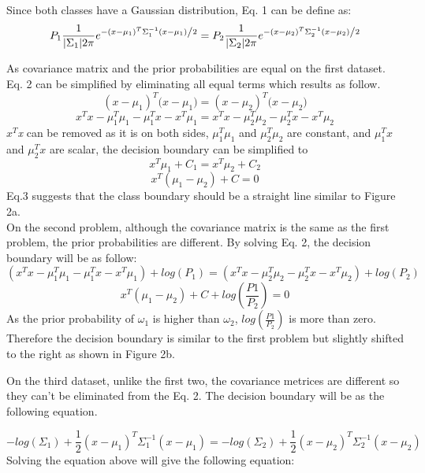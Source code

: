 \documentclass{article}
\begin{document}
Since both classes have a Gaussian distribution, Eq. 1 can be define as:
\begin{equation} \label{eq:2}
P_{1}\frac{1}{{|\Sigma_{1}| 2\pi }}e^{{{ - \left({x - \mu_1} \right)^{T}\Sigma_1^{-1}({x - \mu_1}}) \mathord{\left/ {\vphantom {{ - \left( {x - \mu_{1} } \right)^2 } {2}}} \right. \kern-\nulldelimiterspace} {2}}} = P_{2}\frac{1}{{|\Sigma_{2}| 2\pi }}e^{{{ - \left({x - \mu_2} \right)^{T}\Sigma_2^{-1}({x - \mu_2}}) \mathord{\left/ {\vphantom {{ - \left( {x - \mu_2 } \right)^2 } {2}}} \right. \kern-\nulldelimiterspace} {2}}}
\end{equation}

As covariance matrix and the prior probabilities are equal on the first dataset. Eq. 2 can be simplified by eliminating all equal terms which results as follow.
$$
{{\left({x - \mu_1} \right)^{T}({x - \mu_1}})}  = {{\left({x - \mu_2} \right)^{T}({x - \mu_2}})}
$$
$$
{x^Tx - \mu_1^T\mu_1 - \mu_1^Tx - x^T\mu_1}  = {x^Tx - \mu_2^T\mu_2 - \mu_2^Tx - x^T\mu_2}
$$
\indent \textit{${x^T}$x} can be removed as it is on both sides, $\mu_1^T\mu_1$ and $\mu_2^T\mu_2$ are constant, and $\mu_1^Tx$  and $\mu_2^Tx$ are scalar, the decision boundary can be simplified to
$$x^T\mu_1 + C_1= x^T\mu_2 + C_2$$
\begin{equation} \label{eq:3}
x^T(\mu_1 - \mu_2) + C = 0
\end{equation}
\indent Eq.3 suggests that the class boundary should be a straight line similar to Figure 2a.\\
\indent On the second problem, although the covariance matrix is the same as the first problem, the prior probabilities are different. By solving Eq. 2, the decision boundary will be as follow:
$$
({x^Tx - \mu_1^T\mu_1 - \mu_1^Tx - x^T\mu_1}) + log (P_1) = ({x^Tx - \mu_2^T\mu_2 - \mu_2^Tx - x^T\mu_2}) + log (P_2)
$$
$$
x^T(\mu_1 - \mu_2) + C + log (\frac{P1}{P_2})= 0
$$
\indent As the prior probability of $\omega_1$ is higher than $\omega_2$, $log (\frac{P1}{P_2})$ is more than zero. Therefore the decision boundary is similar to the first problem but slightly shifted to the right as shown in Figure 2b.

\indent On the third dataset, unlike the first two, the covariance metrices are different so they can't be eliminated from the Eq. 2. The decision boundary will be as the following equation.

$$
- log (\Sigma _1) + \frac{1}{2}(x - \mu_1)^T\Sigma _1^{-1} (x - \mu_1) = - log (\Sigma _2) + \frac{1}{2}(x - \mu_2)^T\Sigma _2^{-1} (x - \mu_2)
$$
Solving the equation above will give the following equation:
\end{document}

